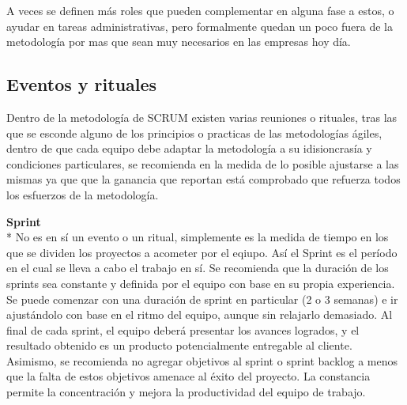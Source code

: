 \documentclass[../pfc.tex]{subfiles}
\begin{document}
	A veces se definen más roles que pueden complementar en alguna fase a estos, o ayudar en tareas administrativas, pero formalmente quedan un poco fuera de la metodología por mas que sean muy necesarios en las empresas hoy día.
	
	\subsection{Eventos y rituales}
	
	Dentro de la metodología de SCRUM existen varias reuniones o rituales, tras las que se esconde alguno de los principios o practicas de las metodologías ágiles\cite{agile}, dentro de que cada equipo debe adaptar la metodología a su idisioncrasía y condiciones particulares, se recomienda en la medida de lo posible ajustarse a las mismas ya que que la ganancia que reportan está comprobado que refuerza todos los esfuerzos de la metodología. 
		
	\textbf{Sprint}\\* 
	No es en sí un evento o un ritual, simplemente es la medida de tiempo en los que se dividen los proyectos a acometer por el eqiupo. Así el Sprint es el período en el cual se lleva a cabo el trabajo en sí. Se recomienda que la duración de los sprints sea constante y definida por el equipo con base en su propia experiencia. Se puede comenzar con una duración de sprint en particular (2 o 3 semanas) e ir ajustándolo con base en el ritmo del equipo, aunque sin relajarlo demasiado. Al final de cada sprint, el equipo deberá presentar los avances logrados, y el resultado obtenido es un producto potencialmente entregable al cliente. Asimismo, se recomienda no agregar objetivos al sprint o sprint backlog a menos que la falta de estos objetivos amenace al éxito del proyecto. La constancia permite la concentración y mejora la productividad del equipo de trabajo.\\
	
\end{document}
